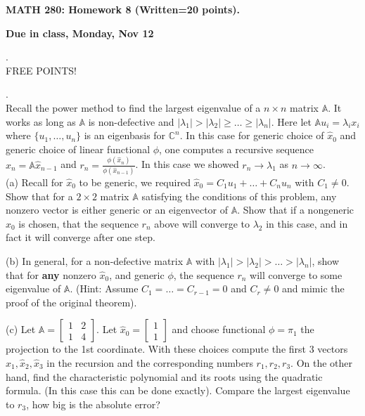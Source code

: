 \documentclass[12 pt]{article}
\begin{document}
\centerline{\bf MATH 280: Homework 8 (Written=20 points). }
\centerline{\bf Due in class, Monday, Nov 12}

\bigskip

. \\ FREE POINTS!
\medskip

. \\ Recall the power method to find the largest eigenvalue of a $n \times n$ matrix $\mathbb{A}$. It works as long as $\mathbb{A}$ is non-defective 
and $|\lambda_1| > |\lambda_2| \geq \dots \geq |\lambda_n|$. Here let $\mathbb{A} u_i = \lambda_i x_i$ where $\{ u_1, \dots, u_n \}$ is an eigenbasis for 
$\mathbb{C}^n$.
In this case for generic choice of $\hat{x}_0$ and generic choice of linear functional $\phi$, one computes a recursive sequence $\hat{x}_n = \mathbb{A} \hat{x}_{n-1}$ and $r_n = \frac{\phi(\hat{x}_{n})}{\phi(\hat{x}_{n-1})}$. In this case we showed $r_n \to \lambda_1$ as $n \to \infty$. \\

\noindent
(a) Recall for $\hat{x}_0$ to be generic, we required $\hat{x}_0=C_1 u_1 + \dots + C_n u_n$ with $C_1 \neq 0$. Show that for a $2 \times 2$ matrix $\mathbb{A}$ 
satisfying the conditions of this problem, any nonzero vector is either generic or an eigenvector of $\mathbb{A}$. Show that if a nongeneric $\hat{x}_0$ 
is chosen, that the sequence $r_n$ above will converge to $\lambda_2$ in this case, and in fact it will converge after one step.

\noindent
(b) In general, for a non-defective matrix $\mathbb{A}$ with $|\lambda_1| > |\lambda_2| > \dots > |\lambda_n|$, show that for {\bf any} nonzero $\hat{x}_0$, 
and generic $\phi$, the sequence $r_n$ will converge to some eigenvalue of $\mathbb{A}$. (Hint: Assume $C_1=\dots=C_{r-1}=0$ and $C_r \neq 0$ 
and mimic the proof of the original theorem).

\noindent
(c) Let $\mathbb{A}=\begin{bmatrix} 1 & 2 \\ 1 & 4 \end{bmatrix}$. Let $\hat{x}_0 = \begin{bmatrix} 1 \\ 1 \end{bmatrix}$ and choose functional 
$\phi=\pi_1$ the projection to the 1st coordinate. With these choices compute the first 3 vectors $\hat{x}_1, \hat{x}_2, \hat{x}_3$ in the recursion and 
the corresponding numbers $r_1, r_2, r_3$. On the other hand, find the characteristic polynomial and its roots using the quadratic formula. (In this case this can be done exactly). Compare the largest eigenvalue to $r_3$, how big is the absolute error?
\end{document}
